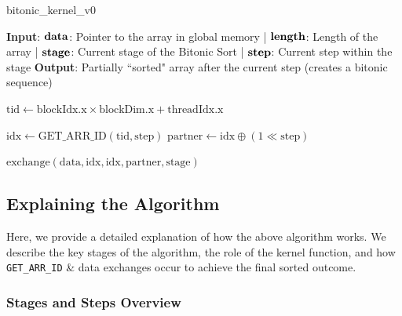 \documentclass[12pt]{article}
\begin{document}
\begin{algorithm}[H]
\caption{bitonic\_kernel\_v0}\label{alg:v0_kernel}
\begin{algorithmic}[1]
\Require \textbf{Input}: 
    \( \text{\textbf{data}} \): Pointer to the array in global memory |  
    \( \text{\textbf{length}} \): Length of the array | 
    \( \text{\textbf{stage}} \): Current stage of the Bitonic Sort | 
    \( \text{\textbf{step}} \): Current step within the stage
\Ensure \textbf{Output}: Partially ``sorted" array after the current step (creates a bitonic sequence)

\State \( \text{tid} \gets \text{blockIdx.x} \times \text{blockDim.x} + \text{threadIdx.x} \) 
    \State \Return {}
\EndIf

\State \( \text{idx} \gets \text{GET\_ARR\_ID}(\text{tid}, \text{step}) \) 
\State \( \text{partner} \gets \text{idx} \oplus (1 \ll \text{step}) \) 

    \State \( \text{exchange}(\text{data}, \text{idx}, \text{idx}, \text{partner}, \text{stage}) \) 
\EndIf
\end{algorithmic}
\end{algorithm}


\subsection{Explaining the Algorithm}
Here, we provide a detailed explanation of how the above algorithm works. We describe the key stages of the algorithm, the role of the kernel function, and how \texttt{GET\_ARR\_ID} \& data exchanges occur to achieve the final sorted outcome.

\subsubsection{Stages and Steps Overview}
\end{document}
